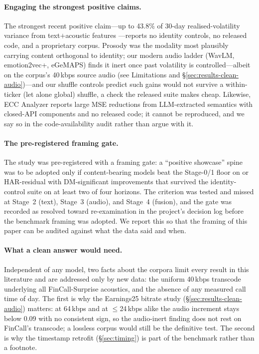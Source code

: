 \paragraph{Engaging the strongest positive claims.}
The strongest recent positive claim---up to 43.8\% of 30-day realised-volatility
variance from text$+$acoustic features \citep{soundofrisk2025}---reports no
identity controls, no released code, and a proprietary corpus. Prosody was the
modality most plausibly carrying content orthogonal to identity; our modern audio
ladder (WavLM, emotion2vec+, eGeMAPS) finds it inert once past volatility is
controlled---albeit on the corpus's 40\,kbps source audio (see Limitations and
\S\ref{sec:results-clean-audio})---and our shuffle controls predict such gains
would not survive a within-ticker (let alone global) shuffle, a check the released
suite makes cheap. Likewise, ECC Analyzer \citep{cao2024ecc} reports large MSE
reductions from LLM-extracted semantics with closed-API components and no released
code; it cannot be reproduced, and we say so in the code-availability audit rather
than argue with it.

\paragraph{The pre-registered framing gate.}
The study was pre-registered with a framing gate: a ``positive showcase'' spine was
to be adopted only if content-bearing models beat the Stage-0/1 floor on \dv{} or
HAR-residual with DM-significant improvements that survived the identity-control
suite on at least two of four horizons. The criterion was tested and missed at
Stage~2 (text), Stage~3 (audio), and Stage~4 (fusion), and the gate was recorded as
resolved toward re-examination in the project's decision log before the benchmark
framing was adopted. We report this so that the framing of this paper can be
audited against what the data said and when.

\paragraph{What a clean answer would need.}
Independent of any model, two facts about the corpora limit every result in this
literature and are addressed only by new data: the uniform 40\,kbps transcode
underlying all FinCall-Surprise acoustics, and the absence of any measured call
time of day. The first is why the Earnings25 bitrate study
(\S\ref{sec:results-clean-audio}) matters: at 64\,kbps and at $\le$24\,kbps alike
the audio increment stays below 0.09 with no consistent sign, so the audio-inert
finding does not rest on FinCall's transcode; a lossless corpus would still be
the definitive test. The second is why the timestamp retrofit (\S\ref{sec:timing})
is part of the benchmark rather than a footnote.
